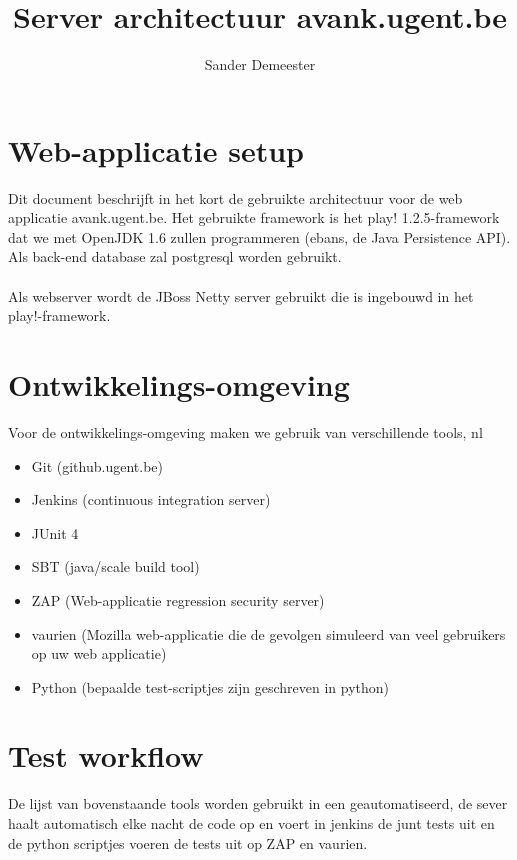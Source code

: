 \documentclass[10pt,a4paper]{report}
\author{Sander Demeester}
\begin{document}
\title{Server architectuur avank.ugent.be}
\section*{Web-applicatie setup}
Dit document beschrijft in het kort de gebruikte architectuur voor de web applicatie avank.ugent.be.
Het gebruikte framework is het play! 1.2.5-framework dat we met OpenJDK 1.6 zullen programmeren  (ebans, de Java Persistence API). Als back-end database zal postgresql worden gebruikt.\\
\\
Als webserver wordt de JBoss Netty server gebruikt die is ingebouwd in het play!-framework.
\section*{Ontwikkelings-omgeving}
Voor de ontwikkelings-omgeving maken we gebruik van verschillende tools, nl
\begin{itemize}
\item Git (github.ugent.be)
\item Jenkins (continuous integration server)
\item JUnit 4
\item SBT (java/scale build tool)
\item ZAP (Web-applicatie regression security server)
\item vaurien (Mozilla web-applicatie die de gevolgen simuleerd van veel gebruikers op uw web applicatie)
\item Python (bepaalde test-scriptjes zijn geschreven in python)
\end{itemize}
\section*{Test workflow}
De lijst van bovenstaande tools worden gebruikt in een geautomatiseerd, de sever haalt automatisch elke nacht de code op en voert in jenkins de junt tests uit en de python scriptjes voeren de tests uit op ZAP en vaurien.
\end{document}
